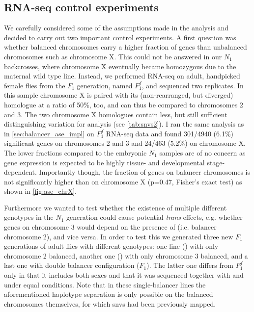 \subsection{RNA-seq control experiments}
\label{sec:balancer_ase_controls}

We carefully considered some of the assumptions made in the \ase analysis and
decided to carry out two important control experiments. A first question was
whether balanced chromosomes carry a higher fraction of \ase genes than
unbalanced chromosomes such as chromosome X. This could not be answered in our
$N_1$ backcrosses, where chromosome X eventually became homozygous due to the
maternal wild type line. Instead, we performed RNA-seq on adult, handpicked
female flies from the $F_1$ generation, named $F_1^f$, and sequenced two
replicates. In this sample chromosome X is paired with its (non-rearranged,
but diverged) homologue at a ratio of 50\%, too, and can thus be compared to
chromosomes 2 and 3. The two chromosome X homologues contain less, but still
sufficient distinguishing variation for \ase analysis (see \cref{tab:snvs2}).
I ran the same \ase analysis as in \cref{sec:balancer_ase_impl} on $F_1^f$
RNA-seq data and found 301/4940 (6.1\%) significant \ase genes on chromosomes
2 and 3 and 24/463 (5.2\%) on chromosome X. The lower fractions compared to
the embryonic $N_1$ samples are of no concern as gene expression is expected to
be highly tissue- and developmental stage-dependent. Importantly though, the
fraction of \ase genes on balancer chromosomes is not significantly higher than
on chromosome X (p=0.47, Fisher’s exact test) as shown in \cref{fig:ase_chrX}.

Furthermore we wanted to test whether the existence of multiple different
genotypes in the $N_1$ generation could cause potential \textit{trans} effects,
e.g. whether genes on chromosome 3 would depend on the presence of \cyo
(i.e. balancer chromosome 2), and vice versa. In order to test this we generated
three new $F_1$ generations of adult flies with different genotypes: one line
(\Fcyo) with only chromosome 2 balanced, another one (\Ftm) with only
chromosome 3 balanced, and a last one with double balancer configuration ($F_1$).
The latter one differs from $F_1^f$ only in that it includes both sexes and that
it was sequenced together with \Fcyo and \Ftm under equal conditions. Note that
in these single-balancer lines the aforementioned haplotype separation is only
possible on the balanced chromosomes themselves, for which \acp{snv} had been
previously mapped.

